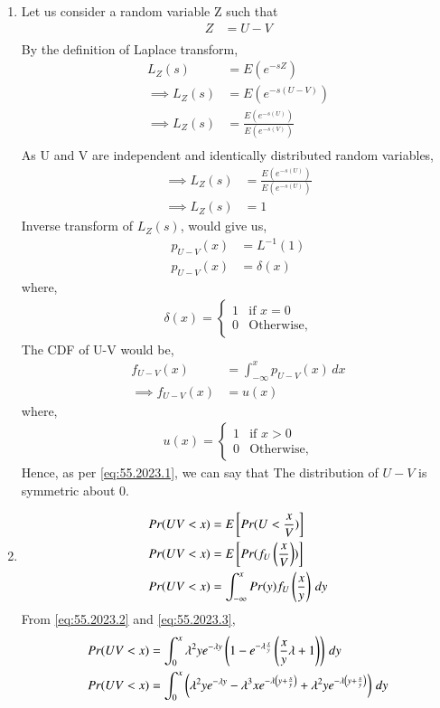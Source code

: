 \documentclass[journal,12pt,twocolumn]{IEEEtran}
\theoremstyle{remark}
\begin{document}
\begin{enumerate}
\item Let us consider a random variable Z such that 
\begin{align}
Z &= U-V\\
\end{align}
By the definition of Laplace transform,
\begin{align}
L_{Z}(s) &= E(e^{-sZ})\\
\implies L_{Z}(s) &= E(e^{-s(U-V)})\\
\implies L_{Z}(s) &= \frac{E(e^{-s(U)})}{E(e^{-s(V)})}\\
\end{align}
As U and V are independent and identically distributed random
variables,
\begin{align}
\implies L_{Z}(s) &= \frac{E(e^{-s(U)})}{E(e^{-s(U)})}\\
\implies L_{Z}(s) &= 1
\end{align}
Inverse transform of $L_{Z}(s)$, would give us,
\begin{align}
p_{U-V}(x) &= L^{-1}(1)\\
p_{U-V}(x) &= \delta(x) \label{eq:55.2023.1}
\end{align}
where,\\
\begin{align}
\delta (x) = 
\begin{cases}
1 & \text{if } x = 0\\
0 & \text{Otherwise,}
\end{cases}
\end{align}
The CDF of U-V would be,
\begin{align}
f_{U-V}(x) &= \int_{-\infty}^{x} p_{U-V}(x) \, dx\\
\implies f_{U-V}(x) &= u(x)
\end{align}
where, \\
\begin{align}
u(x) = 
\begin{cases}
1 & \text{if } x > 0\\
0 & \text{Otherwise,}
\end{cases}
\end{align}
Hence, as per \eqref{eq:55.2023.1}, we can say that The distribution of $U-V$ is symmetric about 0.
\item 
\begin{align}
Pr(UV<x) &= E{}\left[Pr(U<\frac{x}{V})\right]\\
Pr(UV<x) &= E{}\left[Pr(f_{U}\left(\frac{x}{V}\right))\right]\\
Pr(UV<x) &= \int_{-\infty}^{x} Pr(y)f_{U}\left(\frac{x}{y}\right) \, dy\\
\end{align}
From \eqref{eq:55.2023.2} and \eqref{eq:55.2023.3}, 
\begin{align}
Pr(UV<x) &= \int_{0}^{x} \lambda^{2}ye^{-\lambda y} \left(1 - e^{-\lambda \frac{x}{y}}\left(\frac{x}{y}\lambda  + 1\right)\right)  \, dy\\
Pr(UV<x) &= \int_{0}^{x} \left(\lambda^{2}ye^{-\lambda y} - \lambda^{3}xe^{-\lambda\left( y + \frac{x}{y}\right)} + \lambda^{2}ye^{-\lambda\left( y + \frac{x}{y}\right)} \right)\, dy\\
\end{align}
\end{enumerate}
\end{document}
